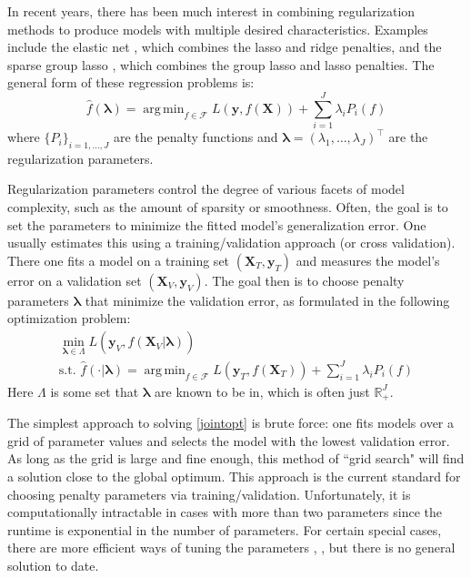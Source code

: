 \documentclass{statsoc}
\DeclareMathOperator*{\argmin}{arg\,min}
\begin{document}
In recent years, there has been much interest in combining regularization methods to produce models with multiple desired characteristics. Examples include the elastic net \citep{zou2003regression}, which combines the lasso and ridge penalties, and the sparse group lasso \citep{simon2013sparse}, which combines the group lasso and lasso penalties. The general form of these regression problems is:
\begin{equation} \label {eq:basic}
\hat f(\boldsymbol{\lambda}) = \argmin_{f\in\mathcal{F}} L\left (\boldsymbol{y}, f (\boldsymbol{X}) \right ) + \sum\limits_{i=1}^J \lambda_i P_i(f)
\end{equation}
where $\{P_i\}_{i=1, ..., J}$ are the penalty functions and $\boldsymbol{\lambda} = (\lambda_1, \ldots, \lambda_J)^\top$ are the regularization parameters.

Regularization parameters control the degree of various facets of model complexity, such as the amount of sparsity or smoothness. Often, the goal is to set the parameters to minimize the fitted model's generalization error. One usually estimates this using a training/validation approach (or cross validation). There one fits a model on a training set $(\boldsymbol X_T, \boldsymbol y_T)$ and measures the model's error on a validation set $(\boldsymbol X_V, \boldsymbol y_V)$. The goal then is to choose penalty parameters $\boldsymbol{\lambda}$ that minimize the validation error, as formulated in the following optimization problem:
\begin{equation}
\begin{array}{c}
\min_{\boldsymbol{\lambda} \in \Lambda} L\left (\boldsymbol{y}_V, \hat f (\boldsymbol{X}_V | \boldsymbol{\lambda}) \right) \\
\text{s.t. } \hat f(\cdot | \boldsymbol{\lambda}) = \argmin_{f\in\mathcal{F}} L \left (\boldsymbol{y}_T, f (\boldsymbol{X}_T) \right) + \sum\limits_{i=1}^J \lambda_i P_i(f)
\end{array}
\label{jointopt}
\end{equation}
Here $\Lambda$ is some set that $\boldsymbol{\lambda}$ are known to be in, which is often just $\mathbb{R}^{J}_+$.

The simplest approach to solving \eqref{jointopt} is brute force: one fits models over a grid of parameter values and selects the model with the lowest validation error. As long as the grid is large and fine enough, this method of ``grid search" will find a solution close to the global optimum. This approach is the current standard for choosing penalty parameters via training/validation. Unfortunately, it is computationally intractable in cases with more than two parameters since the runtime is exponential in the number of parameters. For certain special cases, there are more efficient ways of tuning the parameters \citep{golub1979generalized}, \citep{wood2000modelling}, but there is no general solution to date.
\end{document}

